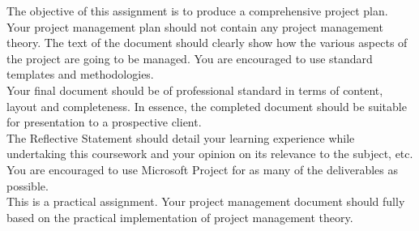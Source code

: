 The objective of this assignment is to produce a comprehensive project plan. Your project management plan should not contain any project management theory. The text of the document should clearly show how the various aspects of the project are going to be managed. You are encouraged to use standard templates and methodologies.\\

Your final document should be of professional standard in terms of content, layout and completeness. In essence, the completed document should be suitable for presentation to a prospective client.\\

The Reflective Statement should detail your learning experience while undertaking this coursework and your opinion on its relevance to the subject, etc.\\

You are encouraged to use Microsoft Project for as many of the deliverables as possible.\\

This is a practical assignment. Your project management document should fully based on the practical implementation of project management theory.\\



